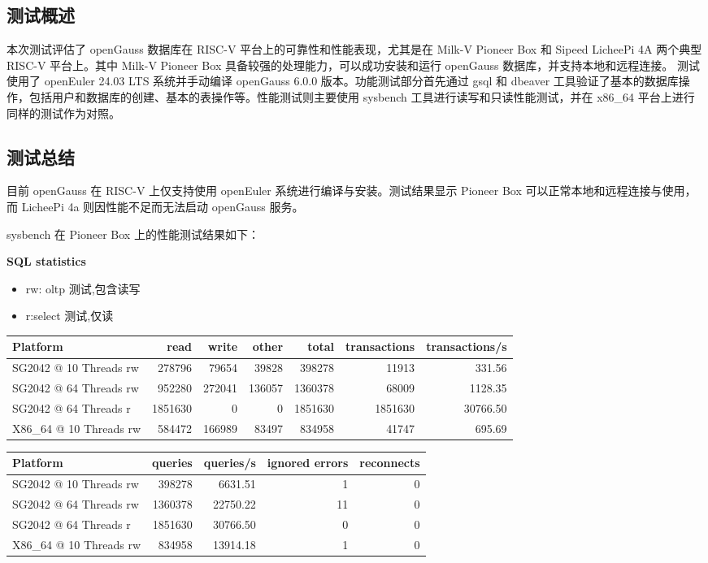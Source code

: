 \documentclass{article}
\begin{document}
\subsection{测试概述}
本次测试评估了 openGauss 数据库在 RISC-V 平台上的可靠性和性能表现，尤其是在 Milk-V Pioneer Box 和 Sipeed LicheePi 4A 两个典型 RISC-V 平台上。其中 Milk-V Pioneer Box 具备较强的处理能力，可以成功安装和运行 openGauss 数据库，并支持本地和远程连接。
测试使用了 openEuler 24.03 LTS 系统并手动编译 openGauss 6.0.0 版本。功能测试部分首先通过 gsql 和 dbeaver 工具验证了基本的数据库操作，包括用户和数据库的创建、基本的表操作等。性能测试则主要使用 sysbench 工具进行读写和只读性能测试，并在 x86\_64 平台上进行同样的测试作为对照。

\subsection{测试总结}
目前 openGauss 在 RISC-V 上仅支持使用 openEuler 系统进行编译与安装。测试结果显示 Pioneer Box 可以正常本地和远程连接与使用，而 LicheePi 4a 则因性能不足而无法启动 openGauss 服务。

sysbench 在 Pioneer Box 上的性能测试结果如下：

\textbf{SQL statistics}

\begin{itemize}
    \item rw: oltp 测试,包含读写 
    \item r:select 测试,仅读
\end{itemize}

\begin{table}[H]
\centering
\begin{tabular}{|l|r|r|r|r|r|r|}
\hline
Platform & read & write & other & total & transactions & transactions/s \\
\hline
SG2042 @ 10 Threads rw & 278796 & 79654 & 39828 & 398278 & 11913 & 331.56 \\
SG2042 @ 64 Threads rw & 952280 & 272041 & 136057 & 1360378 & 68009 & 1128.35 \\
SG2042 @ 64 Threads r  & 1851630 & 0      & 0      & 1851630 & 1851630 & 30766.50 \\
X86\_64 @ 10 Threads rw & 584472 & 166989 & 83497 & 834958 & 41747 & 695.69 \\
\hline
\end{tabular}
\end{table}

\begin{table}[H]
\centering
\begin{tabular}{|l|r|r|r|r|}
\hline
Platform & queries & queries/s & ignored errors & reconnects \\
\hline
SG2042 @ 10 Threads rw & 398278 & 6631.51 & 1 & 0 \\
SG2042 @ 64 Threads rw & 1360378 & 22750.22 & 11 & 0 \\
SG2042 @ 64 Threads r  & 1851630 & 30766.50 & 0 & 0 \\
X86\_64 @ 10 Threads rw & 834958 & 13914.18 & 1 & 0 \\
\hline
\end{tabular}
\end{table}
\end{document}

